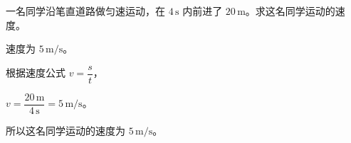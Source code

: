 
\begin{problem}
一名同学沿笔直道路做匀速运动，在 $4\,\mathrm{s}$ 内前进了 $20\,\mathrm{m}$。求这名同学运动的速度。
\end{problem}

\begin{answer}
速度为 $5\,\mathrm{m/s}$。
\end{answer}

\begin{solutions}
根据速度公式 $v=\dfrac{s}{t}$，

$v=\dfrac{20\,\mathrm{m}}{4\,\mathrm{s}}=5\,\mathrm{m/s}$。

所以这名同学运动的速度为 $5\,\mathrm{m/s}$。
\end{solutions}
